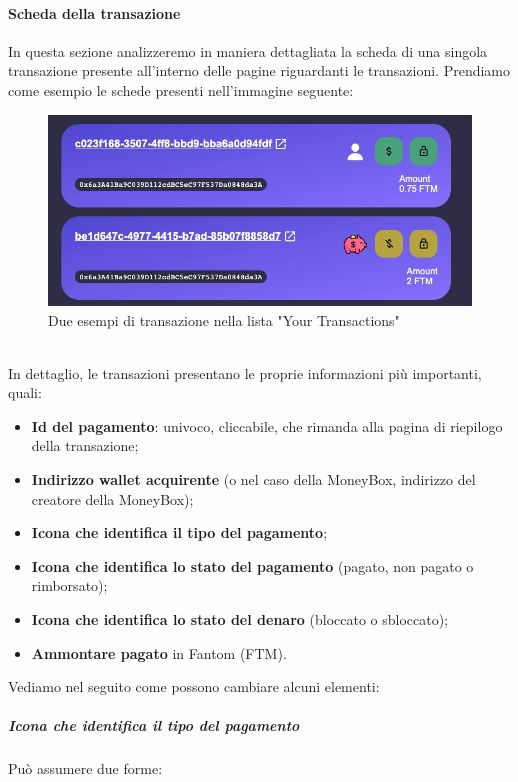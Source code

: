         \paragraph{Scheda della transazione}
        In questa sezione analizzeremo in maniera dettagliata la scheda di una singola transazione presente all'interno delle pagine riguardanti le transazioni.
        Prendiamo come esempio le schede presenti nell'immagine seguente:
        \begin{figure}[H]
            \centering
            \includegraphics[scale=0.4]{immagini/Transaction/transactionsmall.jpg}
            \caption{Due esempi di transazione nella lista "Your Transactions"}
        \end{figure}
        \textbf{}\\
        In dettaglio, le transazioni presentano le proprie informazioni più importanti, quali:
        \begin{itemize}
             \item \textbf{Id del pagamento}: univoco, cliccabile, che rimanda alla pagina di riepilogo della transazione;
            \item \textbf{Indirizzo wallet acquirente} (o nel caso della MoneyBox, indirizzo del creatore della MoneyBox);
            \item \textbf{Icona che identifica il tipo del pagamento};
            \item \textbf{Icona che identifica lo stato del pagamento} (pagato, non pagato o rimborsato);
            \item \textbf{Icona che identifica lo stato del denaro} (bloccato o sbloccato);
            \item \textbf{Ammontare pagato} in Fantom\glo{} (FTM\glo{}).
        \end{itemize}
        Vediamo nel seguito come possono cambiare alcuni elementi:
            \subparagraph{Icona che identifica il tipo del pagamento}
            Può assumere due forme:
